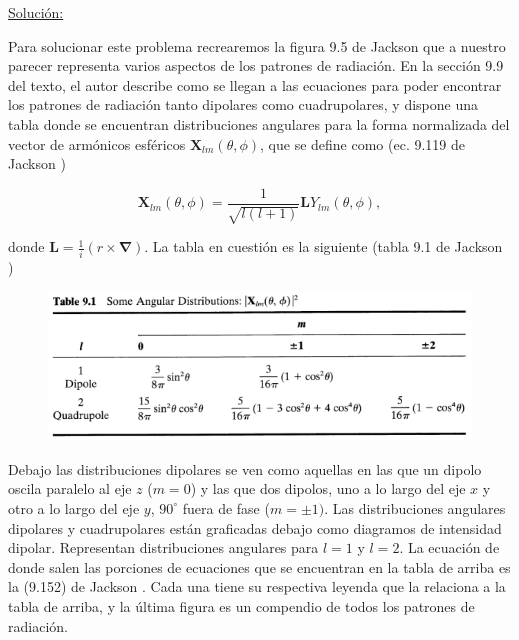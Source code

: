 \documentclass[a4paper,11pt]{article}
\numberwithin{equation}{section}
\begin{document}
\vspace{.3cm} \underline{Solución:} \vspace{.3cm}

Para solucionar este problema recrearemos la figura 9.5 de Jackson \cite{jackson} que 
a nuestro parecer representa varios aspectos de los patrones de radiación. En la 
sección 9.9 del texto, el autor describe como se llegan a las ecuaciones para 
poder encontrar los patrones de radiación tanto dipolares como cuadrupolares, 
y dispone una tabla donde se encuentran distribuciones angulares para la forma 
normalizada del vector de armónicos esféricos $\mathbf{X}_{lm}(\theta,\phi)$, que 
se define como (ec. 9.119 de Jackson \cite{jackson})

\begin{equation}
 \mathbf{X}_{lm}(\theta,\phi) = \frac{1}{\sqrt{l(l+1)}}\mathbf{L}Y_{lm}(\theta,\phi),
\end{equation}

donde $\mathbf{L} = \frac{1}{i}(r \times \pmb{\nabla})$. La tabla en cuestión 
es la siguiente (tabla 9.1 de Jackson \cite{jackson})

\begin{figure}[H]
 \center 
 \includegraphics[scale=0.5]{problema3fig1}
\end{figure}

Debajo las distribuciones dipolares se ven como aquellas en las que un dipolo 
oscila paralelo al eje $z$ ($m=0$) y las que dos dipolos, uno a lo largo del eje 
$x$ y otro a lo largo del eje $y$, $90^\circ$ fuera de fase ($m = \pm 1)$. Las 
distribuciones angulares dipolares y cuadrupolares están graficadas 
debajo como diagramos de intensidad dipolar. Representan distribuciones angulares 
para $l=1$ y $l=2$. La ecuación de donde salen las porciones de ecuaciones que 
se encuentran en la tabla de arriba es la (9.152) de Jackson \cite{jackson}. Cada 
una tiene su respectiva leyenda que la relaciona a la tabla de arriba, y la última 
figura es un compendio de todos los patrones de radiación.
\end{document}
